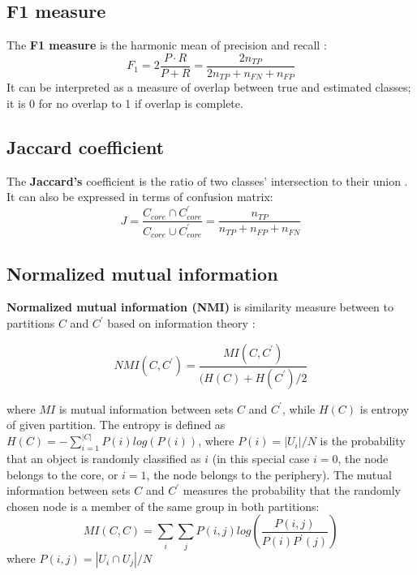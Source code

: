 \subsection{F1 measure}
The \textbf{F1 measure} is the harmonic mean of precision and recall \cite{labatut2012accuracy}:
\begin{equation}
F_1 = 2\frac{P \cdot R}{P+R} = \frac{2n_{TP}}{2n_{TP}+n_{FN} + n_{FP}}
\end{equation}
It can be interpreted as a measure of overlap between true and estimated classes; it is 0 for no overlap to 1 if overlap is complete.

\subsection{Jaccard coefficient}
The \textbf{Jaccard's} coefficient is the ratio of two classes' intersection to their union \cite{labatut2012accuracy}. It can also be expressed in terms of confusion matrix: 
\begin{equation}
J =  \frac{C_{core} \cap C^{'}_{core}}{C_{core} \cup C^{'}_{core}} =   \frac{n_{TP}}{n_{TP}+n_{FP} + n_{FN}}
\end{equation}

\subsection{Normalized mutual information}
\textbf{Normalized mutual information (NMI)} is similarity measure between to partitions $C$ and $C^{'}$  based on information theory \cite{danon2005comparing}:

\begin{equation}
NMI(C, C^{'}) = \frac{MI(C, C^{'})}{(H(C)+H(C^{'})/2}
\end{equation}

where $MI$ is mutual information between sets $C$ and $C^{'}$, while $H(C)$ is entropy of given partition. The entropy is defined as $H(C) = - \sum_{i=1}^{|C|}P(i)log(P(i))$, where $P(i) = |U_i|/N$ is the probability that an object is randomly classified as $i$ (in this special case $i=0$, the node belongs to the core, or $i=1$, the node belongs to the periphery). The mutual information between sets $C$ and $C^{'}$ measures the probability that the randomly chosen node is a member of the same group in both partitions:
\begin{equation}
MI(C, C) = \sum_i\sum_j P(i, j) log(\frac{P(i,j)}{P(i)P^{'}(j)})    
\end{equation}
where $P(i, j)= |U_i \cap U_j|/N$

